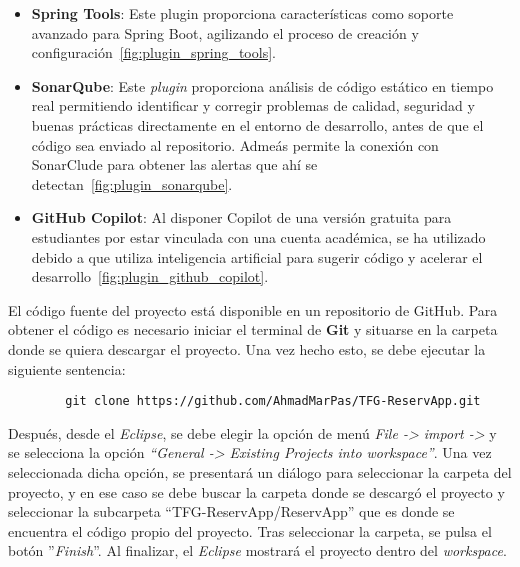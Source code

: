 \begin{itemize}
   \item \textbf{Spring Tools}: Este plugin proporciona características como soporte avanzado para Spring Boot, agilizando el proceso de creación y configuración~\ref{fig:plugin_spring_tools}.
   
   
   \item \textbf{SonarQube}: Este \emph{plugin} proporciona análisis de código estático en tiempo real permitiendo identificar y corregir problemas de calidad, seguridad y buenas prácticas directamente en el entorno de desarrollo, antes de que el código sea enviado al repositorio. Admeás permite la conexión con SonarClude para obtener las alertas que ahí se detectan~\ref{fig:plugin_sonarqube}.

   
   \item \textbf{GitHub Copilot}: Al disponer Copilot de una versión gratuita para estudiantes por estar vinculada con una cuenta académica, se ha utilizado debido a que utiliza inteligencia
artificial para sugerir código y acelerar el desarrollo~\ref{fig:plugin_github_copilot}.


\end{itemize}


El código fuente del proyecto está disponible en un repositorio de GitHub. Para obtener el código es necesario iniciar el terminal de \textbf{Git} y situarse en la carpeta donde se quiera descargar el proyecto. Una vez hecho esto, se debe ejecutar la siguiente sentencia:
	\begin{verbatim}
		git clone https://github.com/AhmadMarPas/TFG-ReservApp.git
	\end{verbatim}
Después, desde el \textit{Eclipse}, se debe elegir la opción de menú \emph{File -> import ->} y se selecciona la opción \emph{``General -> Existing Projects into workspace''}. Una vez seleccionada dicha opción, se presentará un diálogo para seleccionar la carpeta del proyecto, y en ese caso se debe buscar la carpeta donde se descargó el proyecto y seleccionar la subcarpeta ``TFG-ReservApp/ReservApp'' que es donde se encuentra el código propio del proyecto. Tras seleccionar la carpeta, se pulsa el botón ''\emph{Finish}''. Al finalizar, el \textit{Eclipse} mostrará el proyecto dentro del \emph{workspace}.

